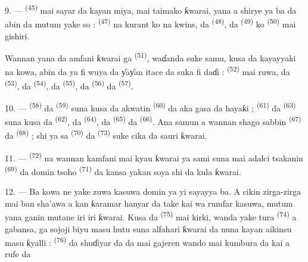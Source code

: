 9. ---  \textsuperscript{(45)} mai sayar da kayan miya,
mai taimako ƙwarai, yana a shirye ya ba da abin da mutum yake so :
 \textsuperscript{(47)} na kurant ko na kwins, da 
\textsuperscript{(48)}, da  \textsuperscript{(49)} ko
 \textsuperscript{(50)} mai gishiri.

Wannan yana da amfani ƙwarai ga 
\textsuperscript{(51)}, waɗanda suke samu, kusa da kayayyaki na kowa, abin
da ya fi wuya da ƴaƴan itace da suka fi daɗi : 
\textsuperscript{(52)} mai ruwa, da  \textsuperscript{(53)}, da
 \textsuperscript{(54)}, da  \textsuperscript{(55)}, da
 \textsuperscript{(56)} da  \textsuperscript{(57)}.

\VUsaut{4.0mm}
\VUsaut{3.0mm}

10. ---  \textsuperscript{(58)} da 
\textsuperscript{(59)} suna kusa da akwatin 
\textsuperscript{(60)} da aka gasa da hayaƙi ; 
\textsuperscript{(61)} da  \textsuperscript{(63)} suna kusa da
 \textsuperscript{(62)}, da 
\textsuperscript{(64)}, da  \textsuperscript{(65)} da
 \textsuperscript{(66)}. Ana samun a wannan shago sabbin
 \textsuperscript{(67)} da  \textsuperscript{(68)} ;
shi ya sa  \textsuperscript{(70)} da 
\textsuperscript{(73)} suke cika da sauri ƙwarai.

11. ---  \textsuperscript{(72)} na wannan kamfani mai kyau
ƙwarai ya sami suna mai adalci tsakanin 
\textsuperscript{(69)} da  domin tsoho  \textsuperscript{(71)} da kansa yakan soya shi da kula
ƙwarai.

\VUsaut{4.0mm}
\VUsaut{3.0mm}

12. --- Ba kowa ne yake zuwa kasuwa domin ya yi sayayya ba. A cikin
zirga-zirga mai ban sha’awa a kan ƙaramar hanyar da take kai wa rumfar
kasuwa, mutum yana ganin mutane iri iri ƙwarai. Kusa da  \textsuperscript{(75)} mai kirki, wanda yake tura
 \textsuperscript{(74)} a gabansa, ga sojoji biyu masu hutu
suna alfahari ƙwarai da nuna kayan aikinsu masu ƙyalli :
 \textsuperscript{(76)} da shuɗiyar  da
 da  mai gajeren wando
mai kumbura da kai a rufe da 

